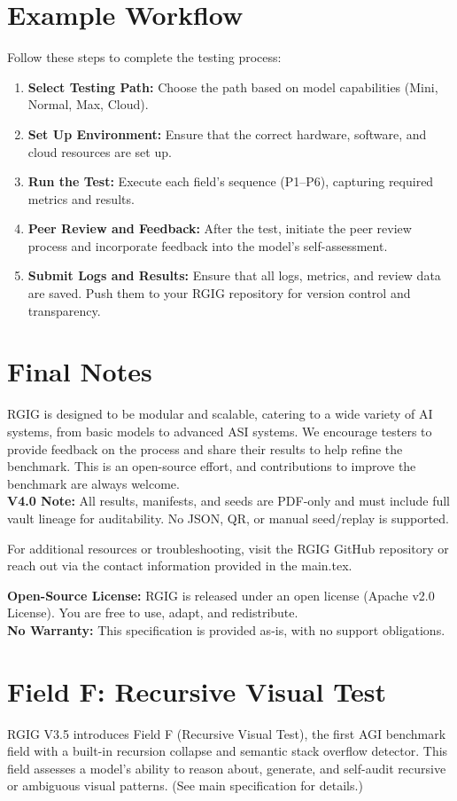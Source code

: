 \section*{Example Workflow}
Follow these steps to complete the testing process:

\begin{enumerate}
  \item \textbf{Select Testing Path:} Choose the path based on model capabilities (Mini, Normal, Max, Cloud).
  \item \textbf{Set Up Environment:} Ensure that the correct hardware, software, and cloud resources are set up.
  \item \textbf{Run the Test:} Execute each field's sequence (P1–P6), capturing required metrics and results.
  \item \textbf{Peer Review and Feedback:} After the test, initiate the peer review process and incorporate feedback into the model's self-assessment.
  \item \textbf{Submit Logs and Results:} Ensure that all logs, metrics, and review data are saved. Push them to your RGIG repository for version control and transparency.
\end{enumerate}

\section*{Final Notes}
RGIG is designed to be modular and scalable, catering to a wide variety of AI systems, from basic models to advanced ASI systems. We encourage testers to provide feedback on the process and share their results to help refine the benchmark. This is an open-source effort, and contributions to improve the benchmark are always welcome.\\
\textbf{V4.0 Note:} All results, manifests, and seeds are PDF-only and must include full vault lineage for auditability. No JSON, QR, or manual seed/replay is supported.

For additional resources or troubleshooting, visit the RGIG GitHub repository or reach out via the contact information provided in the main.tex.

\textbf{Open-Source License:} RGIG is released under an open license (Apache v2.0 License). You are free to use, adapt, and redistribute. \\
\textbf{No Warranty:} This specification is provided as-is, with no support obligations.

\section*{Field F: Recursive Visual Test}
RGIG V3.5 introduces Field F (Recursive Visual Test), the first AGI benchmark field with a built-in recursion collapse and semantic stack overflow detector. This field assesses a model's ability to reason about, generate, and self-audit recursive or ambiguous visual patterns. (See main specification for details.)

